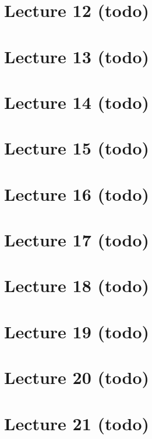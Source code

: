\hypertarget{lecture-12-todo}{%
\section{Lecture 12 (todo)}\label{lecture-12-todo}}

\hypertarget{lecture-13-todo}{%
\section{Lecture 13 (todo)}\label{lecture-13-todo}}

\hypertarget{lecture-14-todo}{%
\section{Lecture 14 (todo)}\label{lecture-14-todo}}

\hypertarget{lecture-15-todo}{%
\section{Lecture 15 (todo)}\label{lecture-15-todo}}

\hypertarget{lecture-16-todo}{%
\section{Lecture 16 (todo)}\label{lecture-16-todo}}

\hypertarget{lecture-17-todo}{%
\section{Lecture 17 (todo)}\label{lecture-17-todo}}

\hypertarget{lecture-18-todo}{%
\section{Lecture 18 (todo)}\label{lecture-18-todo}}

\hypertarget{lecture-19-todo}{%
\section{Lecture 19 (todo)}\label{lecture-19-todo}}

\hypertarget{lecture-20-todo}{%
\section{Lecture 20 (todo)}\label{lecture-20-todo}}

\hypertarget{lecture-21-todo}{%
\section{Lecture 21 (todo)}\label{lecture-21-todo}}

